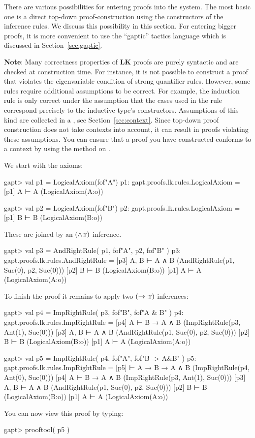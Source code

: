 \documentclass[a4paper,11pt]{book}
\newcommand{\impl}{\to} %
\renewcommand{\land}{\wedge}
\newcommand{\LK}{\textbf{LK}}
\newcommand{\mt}[1]{\textnormal{#1}}
\newcommand{\cli}[1]{{\ttfamily {#1}}}
\begin{document}
There are various possibilities for entering proofs into the system. The most
basic one is a direct top-down proof-construction using the constructors
of the inference rules. We discuss this possibility in this section. For
entering bigger proofs, it is more convenient to use the ``gaptic'' tactics
language which is discussed in Section~\ref{sec:gaptic}.

\textbf{Note}: Many correctness properties of {\LK} proofs are purely syntactic 
and are checked at construction time. For instance, it is not
possible to construct a proof that violates the eigenvariable condition
of strong quantifier rules. However, some rules require additional
assumptions to be correct. For example, the induction rule is only
correct under the assumption that the cases used in the rule
correspond precisely to the inductive type's constructors. Assumptions
of this kind are collected in a \cli{Context}, see Section~\ref{sec:context}.
Since top-down proof construction does not take contexts into account,
it can result in proofs violating these assumptions. You can ensure that
a proof you have constructed conforms to a context \cli{ctx} by using the
\cli{check} method on \cli{ctx}.

We start with the axioms:
%
\begin{clilisting}
gapt> val p1 = LogicalAxiom(fof"A")
p1: gapt.proofs.lk.rules.LogicalAxiom =
[p1] A ⊢ A    (LogicalAxiom(A:o))

gapt> val p2 = LogicalAxiom(fof"B")
p2: gapt.proofs.lk.rules.LogicalAxiom =
[p1] B ⊢ B    (LogicalAxiom(B:o))

\end{clilisting}
%
These are joined by an $(\land\mt{:r})$-inference.
\begin{clilisting}
gapt> val p3 = AndRightRule( p1, fof"A", p2, fof"B" )
p3: gapt.proofs.lk.rules.AndRightRule =
[p3] A, B ⊢ A ∧ B    (AndRightRule(p1, Suc(0), p2, Suc(0)))
[p2] B ⊢ B    (LogicalAxiom(B:o))
[p1] A ⊢ A    (LogicalAxiom(A:o))

\end{clilisting}
%
To finish the proof it remains to apply two $(\impl\mt{:r})$-inferences:
%
\begin{clilisting}
gapt> val p4 = ImpRightRule( p3, fof"B", fof"A & B" )
p4: gapt.proofs.lk.rules.ImpRightRule =
[p4] A ⊢ B → A ∧ B    (ImpRightRule(p3, Ant(1), Suc(0)))
[p3] A, B ⊢ A ∧ B    (AndRightRule(p1, Suc(0), p2, Suc(0)))
[p2] B ⊢ B    (LogicalAxiom(B:o))
[p1] A ⊢ A    (LogicalAxiom(A:o))

gapt> val p5 = ImpRightRule( p4, fof"A", fof"B -> A&B" )
p5: gapt.proofs.lk.rules.ImpRightRule =
[p5]  ⊢ A → B → A ∧ B    (ImpRightRule(p4, Ant(0), Suc(0)))
[p4] A ⊢ B → A ∧ B    (ImpRightRule(p3, Ant(1), Suc(0)))
[p3] A, B ⊢ A ∧ B    (AndRightRule(p1, Suc(0), p2, Suc(0)))
[p2] B ⊢ B    (LogicalAxiom(B:o))
[p1] A ⊢ A    (LogicalAxiom(A:o))

\end{clilisting}
%
You can now view this proof by typing:
\begin{clilisting}
gapt> prooftool( p5 )

\end{clilisting}
\end{document}
